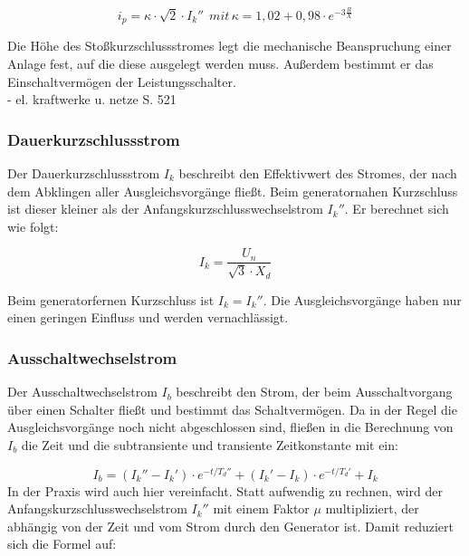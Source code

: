 \documentclass{scrartcl}
\begin{document}
\begin{onehalfspace}
\begin{equation}
i_p = \kappa \cdot \sqrt{2} \cdot I_k'' \hspace{5pt} mit \hspace{2pt} \kappa = 1,02 + 0,98 \cdot e^{-3 \frac{R}{X}}
\end{equation}

Die Höhe des Stoßkurzschlussstromes legt die mechanische Beanspruchung einer Anlage fest, auf die diese ausgelegt werden muss. Außerdem bestimmt er das Einschaltvermögen der Leistungsschalter. \\

- el. kraftwerke u. netze S. 521

\subsubsection{Dauerkurzschlussstrom}
Der Dauerkurzschlussstrom $I_k$ beschreibt den Effektivwert des Stromes, der nach dem Abklingen aller Ausgleichsvorgänge fließt. Beim generatornahen Kurzschluss ist dieser kleiner als der Anfangskurzschlusswechselstrom $I_k''$. Er berechnet sich wie folgt:

\begin{equation}
I_k = \frac{U_n}{\sqrt{3} \cdot X_d}
\end{equation}

 Beim generatorfernen Kurzschluss ist $I_k = I_k''$. Die Ausgleichsvorgänge haben nur einen geringen Einfluss und werden vernachlässigt.

\subsubsection{Ausschaltwechselstrom}
Der Ausschaltwechselstrom $I_b$ beschreibt den Strom, der beim Ausschaltvorgang über einen Schalter fließt und bestimmt das Schaltvermögen. Da in der Regel die Ausgleichsvorgänge noch nicht abgeschlossen sind, fließen in die Berechnung von $I_b$ die Zeit und die  subtransiente und transiente Zeitkonstante mit ein:

\begin{equation}
I_b = (I_k'' - I_k') \cdot e ^{-t/T_d''} +  (I_k' - I_k) \cdot e ^{-t/T_d'} + I_k
\end{equation}
In der Praxis wird auch hier vereinfacht. Statt aufwendig zu rechnen, wird der Anfangskurzschlusswechselstrom $I_k''$ mit einem Faktor $\mu$ multipliziert, der abhängig von der Zeit und vom Strom durch den Generator ist. Damit reduziert sich die Formel auf:


\end{onehalfspace}
\end{document}
